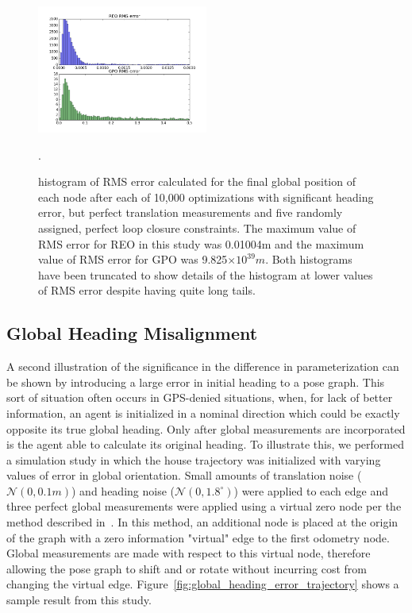 \begin{figure}[H]
  \includegraphics[width=0.5\textwidth]{figures/GPO_vs_REO_bad.png}
  \caption{histogram of RMS error calculated for the final global position of each node after each of 10,000 optimizations with significant heading error, but perfect translation measurements and five randomly assigned, perfect loop closure constraints. The maximum value of RMS error for REO in this study was 0.01004m and the maximum value of RMS error for GPO was 9.825$\times 10 ^{39}m$. Both histograms have been truncated to show details of the histogram at lower values of RMS error despite having quite long tails.}
  \label{fig:GPO_bad_histogram}.
\end{figure}


\subsection{Global Heading Misalignment}

A second illustration of the significance in the difference in parameterization can be shown by introducing a large error in initial heading to a pose graph.  This sort of situation often occurs in GPS-denied situations, when, for lack of better information, an agent is initialized in a nominal direction which could be exactly opposite its true global heading.  Only after global measurements are incorporated is the agent able to calculate its original heading.  To illustrate this, we performed a simulation study in which the house trajectory was initialized with varying values of error in global orientation. Small amounts of translation noise ($\mathcal{N}(0, 0.1m)$) and heading noise ($\mathcal{N}(0, 1.8^\circ)$) were applied to each edge and three perfect global measurements were applied using a virtual zero node per the method described in~\cite{CITE}.  In this method, an additional node is placed at the origin of the graph with a zero information "virtual" edge to the first odometry node.  Global measurements are made with respect to this virtual node, therefore allowing the pose graph to shift and or rotate without incurring cost from changing the virtual edge.  Figure~\ref{fig:global_heading_error_trajectory} shows a sample result from this study.

